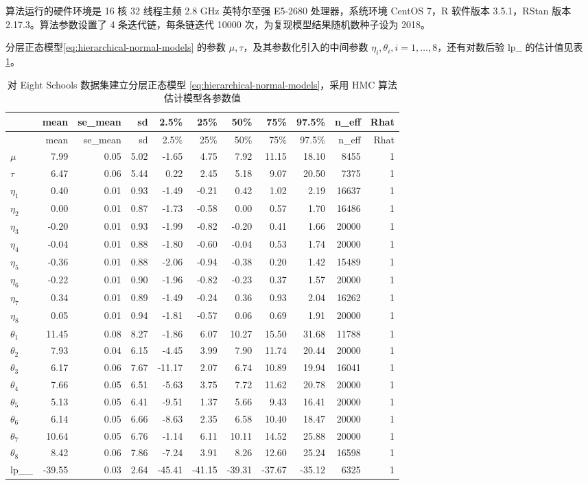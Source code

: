 \documentclass[12pt,a4paper,UTF8,twoside]{book}
\theoremstyle{definition}
\theoremstyle{definition}
\theoremstyle{definition}
\theoremstyle{remark}
\begin{document}
算法运行的硬件环境是 16 核 32 线程主频 2.8 GHz 英特尔至强 E5-2680
处理器，系统环境 CentOS 7，R 软件版本 3.5.1，RStan 版本
2.17.3。算法参数设置了 4 条迭代链，每条链迭代 10000
次，为复现模型结果随机数种子设为 2018。

分层正态模型\eqref{eq:hierarchical-normal-models} 的参数
\(\mu,\tau\)，及其参数化引入的中间参数
\(\eta_i,\theta_i,i=1,\ldots,8\)，还有对数后验 \(\mathrm{lp}\_\_\)
的估计值见表 \ref{tab:eight-schools-output}。

\begin{longtable}[]{@{}lrrrrrrrrrr@{}}
\caption{\label{tab:eight-schools-output} 对 Eight Schools
数据集建立分层正态模型 \eqref{eq:hierarchical-normal-models}，采用 HMC
算法估计模型各参数值}\tabularnewline
\toprule
& mean & se\_mean & sd & 2.5\% & 25\% & 50\% & 75\% & 97.5\% & n\_eff &
Rhat\tabularnewline
\midrule
\endfirsthead
\toprule
& mean & se\_mean & sd & 2.5\% & 25\% & 50\% & 75\% & 97.5\% & n\_eff &
Rhat\tabularnewline
\midrule
\endhead
\(\mu\) & 7.99 & 0.05 & 5.02 & -1.65 & 4.75 & 7.92 & 11.15 & 18.10 &
8455 & 1\tabularnewline
\(\tau\) & 6.47 & 0.06 & 5.44 & 0.22 & 2.45 & 5.18 & 9.07 & 20.50 & 7375
& 1\tabularnewline
\(\eta_1\) & 0.40 & 0.01 & 0.93 & -1.49 & -0.21 & 0.42 & 1.02 & 2.19 &
16637 & 1\tabularnewline
\(\eta_2\) & 0.00 & 0.01 & 0.87 & -1.73 & -0.58 & 0.00 & 0.57 & 1.70 &
16486 & 1\tabularnewline
\(\eta_3\) & -0.20 & 0.01 & 0.93 & -1.99 & -0.82 & -0.20 & 0.41 & 1.66 &
20000 & 1\tabularnewline
\(\eta_4\) & -0.04 & 0.01 & 0.88 & -1.80 & -0.60 & -0.04 & 0.53 & 1.74 &
20000 & 1\tabularnewline
\(\eta_5\) & -0.36 & 0.01 & 0.88 & -2.06 & -0.94 & -0.38 & 0.20 & 1.42 &
15489 & 1\tabularnewline
\(\eta_6\) & -0.22 & 0.01 & 0.90 & -1.96 & -0.82 & -0.23 & 0.37 & 1.57 &
20000 & 1\tabularnewline
\(\eta_7\) & 0.34 & 0.01 & 0.89 & -1.49 & -0.24 & 0.36 & 0.93 & 2.04 &
16262 & 1\tabularnewline
\(\eta_8\) & 0.05 & 0.01 & 0.94 & -1.81 & -0.57 & 0.06 & 0.69 & 1.91 &
20000 & 1\tabularnewline
\(\theta_1\) & 11.45 & 0.08 & 8.27 & -1.86 & 6.07 & 10.27 & 15.50 &
31.68 & 11788 & 1\tabularnewline
\(\theta_2\) & 7.93 & 0.04 & 6.15 & -4.45 & 3.99 & 7.90 & 11.74 & 20.44
& 20000 & 1\tabularnewline
\(\theta_3\) & 6.17 & 0.06 & 7.67 & -11.17 & 2.07 & 6.74 & 10.89 & 19.94
& 16041 & 1\tabularnewline
\(\theta_4\) & 7.66 & 0.05 & 6.51 & -5.63 & 3.75 & 7.72 & 11.62 & 20.78
& 20000 & 1\tabularnewline
\(\theta_5\) & 5.13 & 0.05 & 6.41 & -9.51 & 1.37 & 5.66 & 9.43 & 16.41 &
20000 & 1\tabularnewline
\(\theta_6\) & 6.14 & 0.05 & 6.66 & -8.63 & 2.35 & 6.58 & 10.40 & 18.47
& 20000 & 1\tabularnewline
\(\theta_7\) & 10.64 & 0.05 & 6.76 & -1.14 & 6.11 & 10.11 & 14.52 &
25.88 & 20000 & 1\tabularnewline
\(\theta_8\) & 8.42 & 0.06 & 7.86 & -7.24 & 3.91 & 8.26 & 12.60 & 25.24
& 16598 & 1\tabularnewline
lp\_\_ & -39.55 & 0.03 & 2.64 & -45.41 & -41.15 & -39.31 & -37.67 &
-35.12 & 6325 & 1\tabularnewline
\bottomrule
\end{longtable}
\end{document}
